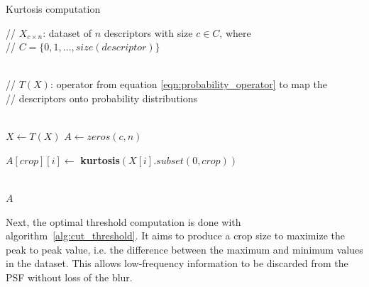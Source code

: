 \begin{algorithm}[H]
	\caption{Kurtosis computation}
	\label{alg:kurtosis_array}
	\begin{algorithmic}[1]
	    \State // $X_{c \times n}$: dataset of $n$ descriptors with size $c \in C$, where \\ // $C = \{0,1,...,size(descriptor)\}$ 
	    
	    \\
	    
	    \State // $T(X)$: operator from equation \ref{eqn:probability_operator} to map the \\ // descriptors onto probability distributions
	   
        \\
        
		\State $X \gets T(X)$
		\State $A \gets zeros(c, n)$
		
		
        		\State $A[crop][i] \gets$ \textbf{kurtosis}$\left(X[i].subset(0, crop)\right)$
		
		    \EndFor
		\EndFor
		
		\\
		
		\Return $A$
	\end{algorithmic}
\end{algorithm}

\noindent Next, the optimal threshold computation is done with algorithm~\ref{alg:cut_threshold}. It aims to produce a crop size to maximize the peak to peak value, i.e. the difference between the maximum and minimum values in the dataset. This allows low-frequency information to be discarded from the PSF without loss of the blur.

